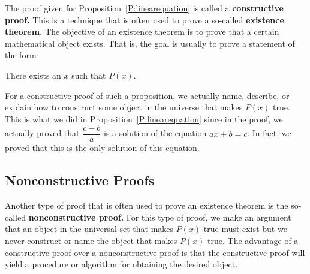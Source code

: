 The proof given for Proposition~\ref{P:linearequation} is called a 
\textbf{constructive proof.}
%
%
  This is a technique that is often used to prove a so-called \textbf{existence theorem.}
%
  The objective of an existence theorem is to prove that a certain mathematical object exists.  That is, the goal is usually to prove a statement of the form  
\begin{center}
There exists an $x$  such that  $P( x )$.
\end{center}
For a constructive proof of such a proposition, we actually name, describe, or explain how to construct  some object in the universe that makes  $P( x )$ true.  This is what we did in Proposition~\ref{P:linearequation} since in the proof, we actually proved that 
$\dfrac{c - b}{a}$ is a solution of the equation $ax + b = c$.  In fact, we proved that this is the only solution of this equation.
%
  


\subsection*{Nonconstructive Proofs}
Another type of proof that is often used to prove an existence theorem is the so-called \textbf{nonconstructive proof.}
%
%
  For this type of proof, we make an argument that an object  in the universal set that makes  
$P( x )$ true must exist but we never construct or name the object that makes  
$P( x )$  true.  The advantage of a constructive proof over a nonconstructive proof is that the constructive proof will yield a procedure or algorithm for obtaining the desired object.

